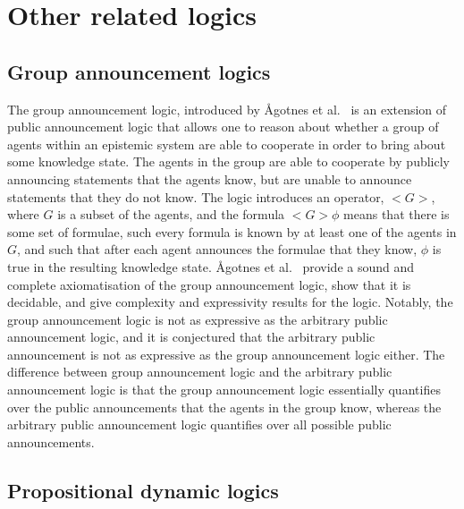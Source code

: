 \section{Other related logics}

\subsection{Group announcement logics}

The group announcement logic, introduced by {\AA}gotnes et
al.~\cite{agotnes2010group} is an extension of public announcement logic that
allows one to reason about whether a group of agents within an epistemic system
are able to cooperate in order to bring about some knowledge state. The agents
in the group are able to cooperate by publicly announcing statements that the
agents know, but are unable to announce statements that they do not know. The
logic introduces an operator, $<G>$, where $G$ is a subset of the agents, and
the formula $<G> \phi$ means that there is some set of formulae, such every
formula is known by at least one of the agents in $G$, and such that after each
agent announces the formulae that they know, $\phi$ is true in the resulting
knowledge state. {\AA}gotnes et al.~\cite{agotnes2010group} provide a sound and
complete axiomatisation of the group announcement logic, show that it is
decidable, and give complexity and expressivity results for the logic. Notably,
the group announcement logic is not as expressive as the arbitrary public
announcement logic, and it is conjectured that the arbitrary public announcement
is not as expressive as the group announcement logic either.  The difference
between group announcement logic and the arbitrary public announcement logic is
that the group announcement logic essentially quantifies over the public
announcements that the agents in the group know, whereas the arbitrary public
announcement logic quantifies over all possible public announcements.

\subsection{Propositional dynamic logics}

